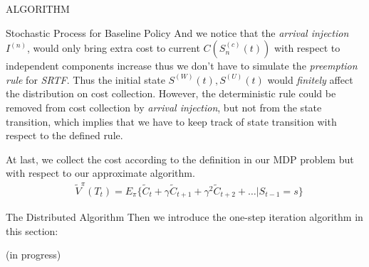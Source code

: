 \documentclass[10pt, conference, letterpaper]{IEEEtran}
\begin{document}
\begin{section}{ALGORITHM}
\begin{subsection}{Stochastic Process for Baseline Policy}
            And we notice that the \emph{arrival injection} $I^{(n)}$, would only bring extra cost to current $C(S^{(c)}_{n}(t))$ with respect to independent components increase thus we don't have to simulate the \emph{preemption rule} for \emph{SRTF}. Thus the initial state $S^{(W)}(t), S^{(U)}(t)$ would \emph{finitely} affect the distribution on cost collection. However, the deterministic rule could be removed from cost collection by \emph{arrival injection}, but not from the state transition, which implies that we have to keep track of state transition with respect to the defined rule.

            At last, we collect the cost according to the definition in our MDP problem but with respect to our approximate algorithm.
            \begin{align}
                & \tilde{V}^{\pi}(T_t)
                \nonumber%
                = E_{\pi} \{ \tilde{C}_{t} + \gamma \tilde{C}_{t+1} + \gamma^2 \tilde{C}_{t+2} + \dots |S_{t-1}=s \}
            \end{align}
        \end{subsection}

        \begin{subsection}{The Distributed Algorithm}
            Then we introduce the one-step iteration algorithm in this section:
            \begin{algorithm}[H]
                \caption{Distributed Algorithm for $k$-th AP}
                \begin{algorithmic}
                    \WHILE{\TRUE}
                        \STATE (in progress)
                    \ENDWHILE
                \end{algorithmic}
            \end{algorithm}
        \end{subsection}
        
    \end{section}
\end{document}
